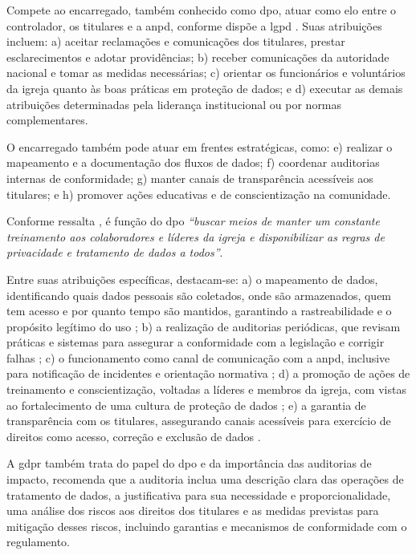 Compete ao encarregado, também conhecido como \gls{dpo}, atuar como elo entre o controlador, os titulares e a \gls{anpd}, conforme dispõe a \gls{lgpd} \cite[art.~41]{lgpd2018}. Suas atribuições incluem: a) aceitar reclamações e comunicações dos titulares, prestar esclarecimentos e adotar providências; b) receber comunicações da autoridade nacional e tomar as medidas necessárias; c) orientar os funcionários e voluntários da igreja quanto às boas práticas em proteção de dados; e d) executar as demais atribuições determinadas pela liderança institucional ou por normas complementares.

O encarregado também pode atuar em frentes estratégicas, como: e) realizar o mapeamento e a documentação dos fluxos de dados; f) coordenar auditorias internas de conformidade; g) manter canais de transparência acessíveis aos titulares; e h) promover ações educativas e de conscientização na comunidade.

Conforme ressalta , é função do \gls{dpo} \textit{``buscar meios de manter um constante treinamento aos colaboradores e líderes da igreja e disponibilizar as regras de privacidade e tratamento de dados a todos''}.

Entre suas atribuições específicas, destacam-se: a) o mapeamento de dados, identificando quais dados pessoais são coletados, onde são armazenados, quem tem acesso e por quanto tempo são mantidos, garantindo a rastreabilidade e o propósito legítimo do uso \cite[art.~6]{lgpd2018}; b) a realização de auditorias periódicas, que revisam práticas e sistemas para assegurar a conformidade com a legislação e corrigir falhas \cite[art.~50]{lgpd2018}; c) o funcionamento como canal de comunicação com a \gls{anpd}, inclusive para notificação de incidentes e orientação normativa \cite[art.~41]{lgpd2018}; d) a promoção de ações de treinamento e conscientização, voltadas a líderes e membros da igreja, com vistas ao fortalecimento de uma cultura de proteção de dados \cite[art.~50]{lgpd2018}; e) a garantia de transparência com os titulares, assegurando canais acessíveis para exercício de direitos como acesso, correção e exclusão de dados \cite[arts.~9º e 18º]{lgpd2018}.

A \gls{gdpr} também trata do papel do \gls{dpo} e da importância das auditorias de impacto, recomenda que a auditoria inclua uma descrição clara das operações de tratamento de dados, a justificativa para sua necessidade e proporcionalidade, uma análise dos riscos aos direitos dos titulares e as medidas previstas para mitigação desses riscos, incluindo garantias e mecanismos de conformidade com o regulamento. \cite[art.~35]{gdpr2016}

